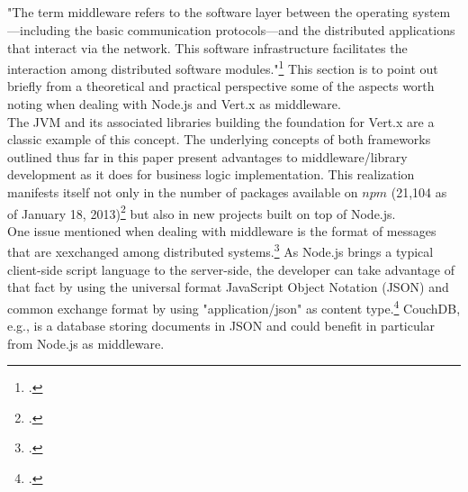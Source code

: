 \newpage \begin{appendices} 
\appendixtocon %

\appendixpage %

\subsection*{\listappendixname}
\listofappendices

\newpage

\begin{subappendices}
\renewcommand{\setthesubsection}{\arabic{subsection}:}%


\label{middleware}
"The term middleware refers to the software layer between the operating system—including the basic communication protocols—and the distributed applications that interact via the network. This software infrastructure facilitates the
interaction among distributed software modules."\footcite[][]{Geihs_2001} This section is to point out briefly from a theoretical and practical perspective some of the aspects worth noting when dealing with Node.js and Vert.x as middleware.\\

The JVM and its associated libraries building the foundation for Vert.x are a classic example of this concept. The underlying concepts of both frameworks outlined thus far in this paper present advantages to middleware/library development as it does for business logic implementation. This realization manifests itself not only in the number of packages available on $npm$ (21,104 as of January 18, 2013)\footcite[Cf.][]{node_packages} but also in new projects built on top of Node.js.\\

One issue mentioned when dealing with middleware is the format of messages that are xexchanged among distributed systems.\footcite[149]{Tannenbaum_2007} As Node.js brings a typical client-side script language to the server-side, the developer can take advantage of that fact by using the universal format JavaScript Object Notation (JSON) and common exchange format by using "application/json" as content type.\footcite[Cf.][]{rfc4627} CouchDB, e.g., is a database storing documents in JSON and could benefit in particular from Node.js as middleware.\\


\end{subappendices}
\end{appendices}
